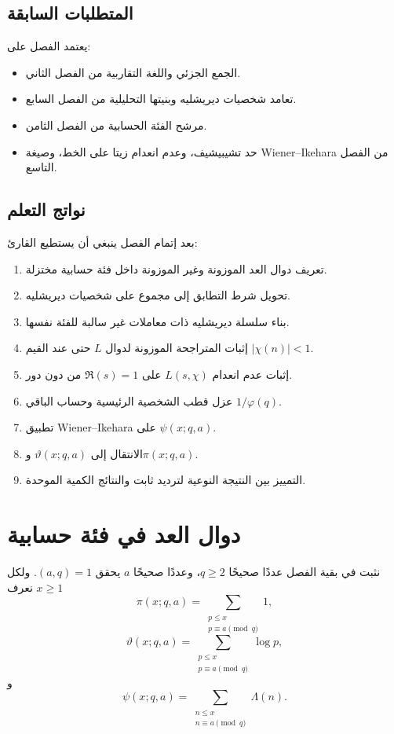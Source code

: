 \subsection{المتطلبات السابقة}

يعتمد الفصل على:
\begin{itemize}
  \item الجمع الجزئي واللغة التقاربية من الفصل الثاني.
  \item تعامد شخصيات ديريشليه وبنيتها التحليلية من الفصل السابع.
  \item مرشح الفئة الحسابية من الفصل الثامن.
  \item حد تشيبيشيف، وعدم انعدام زيتا على الخط، وصيغة Wiener--Ikehara من
  الفصل التاسع.
\end{itemize}

\subsection{نواتج التعلم}

بعد إتمام الفصل ينبغي أن يستطيع القارئ:
\begin{enumerate}
  \item تعريف دوال العد الموزونة وغير الموزونة داخل فئة حسابية مختزلة.
  \item تحويل شرط التطابق إلى مجموع على شخصيات ديريشليه.
  \item بناء سلسلة ديريشليه ذات معاملات غير سالبة للفئة نفسها.
  \item إثبات المتراجحة الموزونة لدوال \(L\) حتى عند القيم
  \(|\chi(n)|<1\).
  \item إثبات عدم انعدام \(L(s,\chi)\) على \(\Re(s)=1\) من دون دور.
  \item عزل قطب الشخصية الرئيسية وحساب الباقي \(1/\varphi(q)\).
  \item تطبيق Wiener--Ikehara على \(\psi(x;q,a)\).
  \item الانتقال إلى \(\vartheta(x;q,a)\) و\(\pi(x;q,a)\).
  \item التمييز بين النتيجة النوعية لترديد ثابت والنتائج الكمية الموحدة.
\end{enumerate}

\section{دوال العد في فئة حسابية}

نثبت في بقية الفصل عددًا صحيحًا \(q\ge2\)، وعددًا صحيحًا \(a\) يحقق
\((a,q)=1\). ولكل \(x\ge1\) نعرف
\[
\pi(x;q,a)
=
\sum_{\substack{p\le x\\p\equiv a\pmod q}}1,
\]
\[
\vartheta(x;q,a)
=
\sum_{\substack{p\le x\\p\equiv a\pmod q}}\log p,
\]
و
\[
\psi(x;q,a)
=
\sum_{\substack{n\le x\\n\equiv a\pmod q}}\Lambda(n).
\]

